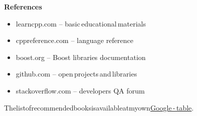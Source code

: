 \documentclass{beamer}
\begin{document}
\begin{frame}{\bf References}

    \begin{itemize}

        \item learncpp.com -- basic\,educational\,materials

        \item cppreference.com -- language reference

        \item boost.org -- Boost libraries documentation

        \item github.com -- open\,projects\,and\,libraries

        \item stackoverflow.com -- developers QA forum

    \end{itemize}

    \begin{block}
    \justifying The\:list\:of\:recommended\:books\:is\:available\:at\:my\:own\:\href{https://docs.google.com/spreadsheets/d/1MAx4-DoZUrZEB210XJ524e-0OogZRvH7QBorja_tGiw/edit?usp=sharing}{Google\,-\,table}.
    \end{block}
    
\end{frame}
\end{document}
